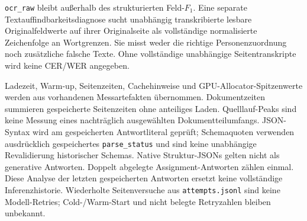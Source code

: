 \texttt{ocr\_raw} bleibt außerhalb des strukturierten Feld-$F_1$. Eine separate Textauffindbarkeitsdiagnose sucht unabhängig transkribierte lesbare Originalfeldwerte auf ihrer Originalseite als vollständige normalisierte Zeichenfolge an Wortgrenzen. Sie misst weder die richtige Personenzuordnung noch zusätzliche falsche Texte. Ohne vollständige unabhängige Seitentranskripte wird keine CER/WER angegeben.

Ladezeit, Warm-up, Seitenzeiten, Cachehinweise und GPU-Allocator-Spitzenwerte werden aus vorhandenen Messartefakten übernommen. Dokumentzeiten summieren gespeicherte Seitenzeiten ohne anteiliges Laden. Quelllauf-Peaks sind keine Messung eines nachträglich ausgewählten Dokumentteilumfangs. JSON-Syntax wird am gespeicherten Antwortliteral geprüft; Schemaquoten verwenden ausdrücklich gespeichertes \texttt{parse\_status} und sind keine unabhängige Revalidierung historischer Schemas. Native Struktur-JSONs gelten nicht als generative Antworten. Doppelt abgelegte Assignment-Antworten zählen einmal. Diese Analyse der letzten gespeicherten Antworten ersetzt keine vollständige Inferenzhistorie. Wiederholte Seitenversuche aus \texttt{attempts.jsonl} sind keine Modell-Retries; Cold-/Warm-Start und nicht belegte Retryzahlen bleiben unbekannt.
